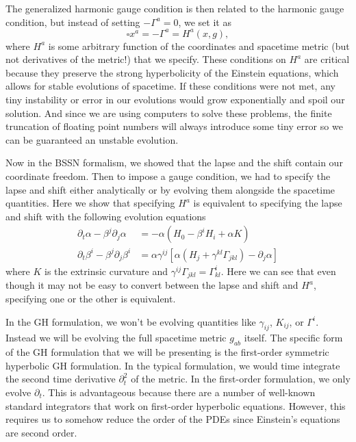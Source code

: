 \begin{bibunit}[unsrtnat]
The generalized harmonic gauge condition is then related to the harmonic gauge
condition, but instead of setting $-\Gamma^a = 0$, we set it as
\begin{equation}\label{eq:gh_gauge}
   \square x^a = -\Gamma^a = H^a(x,g) ,
\end{equation}
where $H^a$ is some arbitrary function of the coordinates and spacetime metric
(but not derivatives of the metric!) that we specify. These conditions on $H^a$
are critical because they preserve the strong hyperbolicity of the Einstein
equations, which allows for stable evolutions of spacetime. If these conditions
were not met, any tiny instability or error in our evolutions would grow
exponentially and spoil our solution. And since we are using computers to solve
these problems, the finite truncation of floating point numbers will always
introduce some tiny error so we can be guaranteed an unstable evolution.

Now in the BSSN formalism, we showed that the lapse and the shift contain our
coordinate freedom. Then to impose a gauge condition, we had to specify the
lapse and shift either analytically or by evolving them alongside the spacetime
quantities. Here we show that specifying $H^a$ is equivalent to specifying the
lapse and shift with the following evolution equations\cite{Lindblom:2005qh}
\begin{align}
   \partial_t\alpha - \beta^j\partial_j\alpha &=
      -\alpha(H_0 - \beta^iH_i + \alpha K) \\
   \partial_t\beta^i - \beta^j\partial_j\beta^i &=
      \alpha\gamma^{ij}\left[\alpha(H_j + \gamma^{kl}\Gamma_{jkl})-\partial_j\alpha\right]
\end{align}
where $K$ is the extrinsic curvature and
$\gamma^{ij}\Gamma_{jkl}=\Gamma^i_{kl}$. Here we can see that even though it may
not be easy to convert between the lapse and shift and $H^a$, specifying one or
the other is equivalent.

In the GH formulation, we won't be evolving quantities like $\gamma_{ij}$,
$K_{ij}$, or $\Gamma^i$. Instead we will be evolving the full spacetime metric
$g_{ab}$ itself. The specific form of the GH formulation that we will be
presenting is the first-order symmetric hyperbolic GH formulation. In the
typical formulation, we would time integrate the second time derivative
$\partial^2_t$ of the metric. In the first-order formulation, we only evolve
$\partial_t$. This is advantageous because there are a number of well-known
standard integrators that work on first-order hyperbolic equations. However,
this requires us to somehow reduce the order of the PDEs since Einstein's
equations are second order.


\end{bibunit}
